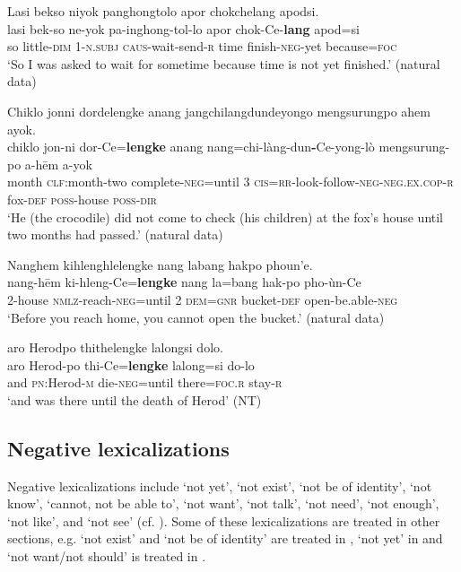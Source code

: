 \documentclass[output=paper,colorlinks,citecolor=brown]{langscibook}
\begin{document}
\ea\label{ex:amr:52}Lasi bekso niyok panghongtolo apor chokchelang apodsi.\\
    \gll lasi bek-so ne-yok pa-inghong-tol-lo apor chok-Ce-\textbf{lang} apod=si \\
         so little-\textsc{dim} 1-\textsc{n.subj} \textsc{caus}{}-wait-send-\textsc{r} time finish-\textsc{neg}{}-yet because=\textsc{foc}\\
    \glt ‘So I was asked to wait for sometime because time is not yet finished.’ (natural data)
\z

\ea\label{ex:amr:53}Chiklo jonni dordelengke anang jangchilangdundeyongo mengsurungpo ahem ayok. \\
    \gll chiklo jon-ni dor-Ce=\textbf{lengke} anang nang=chi-l\`{a}ng-dun\textbf{{}-}Ce-yong-lò mengsurung-po a-h\={e}m a-yok \\
         month \textsc{clf}:month-two complete-\textsc{neg}=until 3 \textsc{cis}=\textsc{rr}{}-look-follow-\textsc{neg}{}-\textsc{neg}.\textsc{ex}.\textsc{cop}{}-\textsc{r} fox-\textsc{def} \textsc{poss}{}-house \textsc{poss}{}-\textsc{dir} \\
    \glt ‘He (the crocodile) did not come to check (his children) at the fox’s house until two months had passed.’  (natural data)
\z

\ea\label{ex:amr:54}Nanghem kihlenghlelengke nang labang hakpo phoun’e. \\
    \gll nang-hēm ki-hleng-Ce=\textbf{lengke} nang la=bang hak-po pho-\`{u}n-Ce\\
          2-house \textsc{nmlz}{}-reach-\textsc{neg}=until 2 \textsc{dem}=\textsc{gnr} bucket-\textsc{def} open-be.able-\textsc{neg}\\
    \glt ‘Before you reach home, you cannot open the bucket.’ (natural data)
\z

\ea\label{ex:amr:55} aro Herodpo thithelengke lalongsi dolo.\\
    \gll aro Herod{}-po thi{}-Ce=\textbf{lengke} lalong=si do-lo\\
         and \textsc{pn}:Herod-\textsc{m} die-\textsc{neg}=until there=\textsc{foc}.\textsc{r} stay-\textsc{r}\\
    \glt ‘and was there until the death of Herod’ (NT)
\z

\subsection{Negative lexicalizations} \label{sec:amr:2.5}

Negative lexicalizations include ‘not yet’, ‘not exist’, ‘not be of identity', ‘not know', ‘cannot, not be able to', ‘not want', ‘not talk', ‘not need', ‘not enough', ‘not like', and ‘not see' (cf. \citealt{Veselinova2013lexicalization}). Some of these lexicalizations are treated in other sections, e.g. ‘not exist’ and ‘not be of identity’ are treated in , ‘not yet’ in  and ‘not want/not should’ is treated in . 
\end{document}
